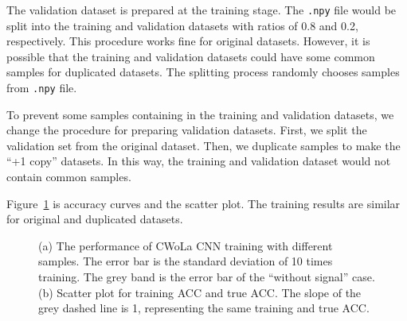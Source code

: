 \documentclass[12pt]{article}
\begin{document}
		The validation dataset is prepared at the training stage. The \verb|.npy| file would be split into the training and validation datasets with ratios of 0.8 and 0.2, respectively. This procedure works fine for original datasets. However, it is possible that the training and validation datasets could have some common samples for duplicated datasets. The splitting process randomly chooses samples from \verb|.npy| file.

		To prevent some samples containing in the training and validation datasets, we change the procedure for preparing validation datasets. First, we split the validation set from the original dataset. Then, we duplicate samples to make the ``+1 copy'' datasets. In this way, the training and validation dataset would not contain common samples.

		Figure~\ref{fig:acc_curve_split_validation_first} is accuracy curves and the scatter plot. The training results are similar for original and duplicated datasets.
		\begin{figure}[htpb]
			\centering
			\caption{(a) The performance of CWoLa CNN training with different samples. The error bar is the standard deviation of 10 times training. The grey band is the error bar of the ``without signal'' case. (b) Scatter plot for training ACC and true ACC. The slope of the grey dashed line is 1, representing the same training and true ACC.}
			\label{fig:acc_curve_split_validation_first}
		\end{figure}
		
\end{document}
